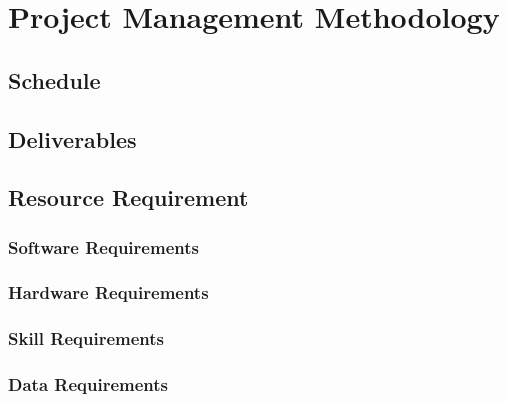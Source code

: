 \section{Project Management Methodology}

\subsection{Schedule}

\subsection{Deliverables}

\subsection{Resource Requirement}

\subsubsection{Software Requirements}

\subsubsection{Hardware Requirements}

\subsubsection{Skill Requirements}

\subsubsection{Data Requirements}